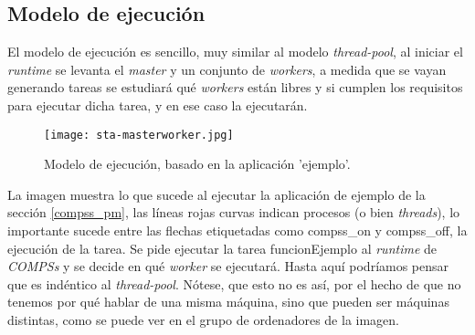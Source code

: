 \begin{comment}
\subsubsection{Compilación}

Para compilar la aplicacion en \textit{COMPSs} de \textit{C/C++}, 

\begin{figure}[H]
    \centering
    \caption{Proceso de compilado de una aplicación COMPSs C/C++}
    \texttt{[image: proceso\_compilado.jpg]}
    \label{fig:proceso_compilado}
\end{figure}
\end{comment}

\subsection{Modelo de ejecución\label{modeloejecucion}}

El modelo de ejecución es sencillo, muy similar al modelo \textit{thread-pool}, al iniciar el \textit{runtime} se levanta el \textit{master} y un conjunto de \textit{workers}, a medida que se vayan generando tareas se estudiará qué \textit{workers} están libres y si cumplen los requisitos para ejecutar dicha tarea, y en ese caso la ejecutarán. 

\begin{figure}[H]
    \centering 
    \caption{Modelo de ejecución, basado en la aplicación 'ejemplo'.}
    \texttt{[image: sta-masterworker.jpg]}
    \label{fig:masterworker_pool}
\end{figure}

La imagen muestra lo que sucede al ejecutar la aplicación de ejemplo de la sección \ref{compss_pm}, las líneas rojas curvas indican procesos (o bien \textit{threads}), lo importante sucede entre las flechas etiquetadas como compss\_on y compss\_off, la ejecución de la tarea. Se pide ejecutar la tarea funcionEjemplo al \textit{runtime} de \textit{COMPSs} y se decide en qué \textit{worker} se ejecutará. Hasta aquí podríamos pensar que es indéntico al \textit{thread-pool}. Nótese, que esto no es así, por el hecho de que no tenemos por qué hablar de una misma máquina, sino que pueden ser máquinas distintas, como se puede ver en el grupo de ordenadores de la imagen. 
\par\bigskip

